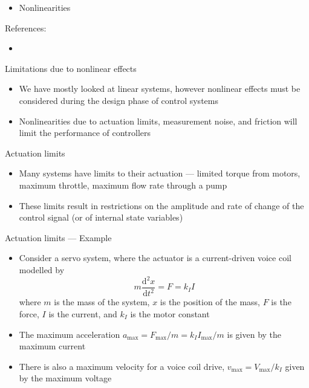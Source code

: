 \documentclass[10pt]{beamer-control}
\begin{document}

\begin{SUMMARY}
  \begin{itemize}
    \item Nonlinearities
  \end{itemize}
  \vfill References:
  \begin{itemize}
    \item \astrom[§14.6]
  \end{itemize}
\end{SUMMARY}




\begin{frame}{Limitations due to nonlinear effects}
  \begin{itemize}
    \item We have mostly looked at linear systems, however nonlinear effects must be considered during the design phase of control systems
    \item Nonlinearities due to actuation limits, measurement noise, and friction will limit the performance of controllers
  \end{itemize}
\end{frame}


\begin{frame}{Actuation limits}
  \begin{itemize}
    \item Many systems have limits to their actuation --- limited torque from motors, maximum throttle, maximum flow rate through a pump
    \item These limits result in restrictions on the amplitude and rate of change of the control signal (or of internal state variables)
  \end{itemize}
\end{frame}


\begin{frame}{Actuation limits --- Example}
  \begin{itemize}
    \item Consider a servo system, where the actuator is a current-driven voice coil modelled by
      \begin{equation}
        m\frac{\mathrm{d}^2x}{\mathrm{d}t^2}=F=k_I I
      \end{equation}
      where $m$ is the mass of the system, $x$ is the position of the mass, $F$ is the force, $I$ is the current, and $k_I$ is the motor constant
    \item The maximum acceleration $a_{\text{max}} =F_{\text{max}}/m=k_I I_{\text{max}}/m $ is given by the maximum current
    \item There is also a maximum velocity for a voice coil drive, $v_{\text{max}}=V_{\text{max}}/k_I$ given by the maximum voltage
  \end{itemize}
\end{frame}
\end{document}
